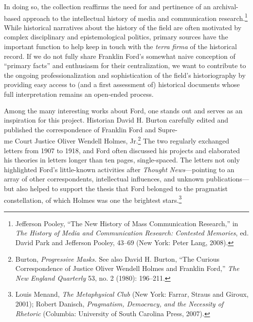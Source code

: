 \documentclass[twoside,symmetric,nobib,justified]{tufte-book}
\begin{document}
In doing so, the collection reaffirms the need for and pertinence of an
archival-based approach to the intellectual history of media and
communication research.\footnote{Jefferson Pooley, ``The New History of
  Mass Communication Research,'' in \emph{The History of Media and
  Communication Research: Contested Memories}, ed. David Park and
  Jefferson Pooley, 43--69 (New York: Peter Lang, 2008).} While
historical narratives about the history of the field are often motivated
by complex disciplinary and epistemological politics, primary sources
have the important function to help keep in touch with the \emph{terra
firma} of the historical record. If we do not fully share Franklin
Ford's somewhat naive conception of ``primary facts'' and enthusiasm for
their centralization, we want to contribute to the ongoing
professionalization and sophistication of the field's historiography by
providing easy access to (and a first assessment of) historical
documents whose full interpretation remains an open-ended process.

Among the many interesting works about Ford, one stands out and serves
as an inspiration for this project. Historian David H. Burton carefully
edited and published the correspondence of Franklin Ford and Supre-\\\noindent me
Court Justice Oliver Wendell Holmes, Jr.\footnote{Burton,
  \emph{Progressive Masks.} See also David H. Burton, ``The Curious
  Correspondence of Justice Oliver Wendell Holmes and Franklin Ford,''
  \emph{The New England Quarterly} 53, no. 2 (1980): 196--211.} The two
regularly exchanged letters from 1907 to 1918, and Ford often discussed
his projects and elaborated his theories in letters longer than ten
pages, single-spaced. The letters not only highlighted Ford's
little-known activities after \emph{Thought News}---pointing to an array
of other correspondents, intellectual influences, and unknown
publications---but also helped to support the thesis that Ford belonged
to the pragmatist constellation, of which Holmes was one the brightest
stars.\footnote{Louis Menand, \emph{The Metaphysical Club} (New York:
  Farrar, Straus and Giroux, 2001); Robert Danisch, \emph{Pragmatism,
  Democracy, and the Necessity of Rhetoric} (Columbia: University of
  South Carolina Press, 2007).}
\end{document}
